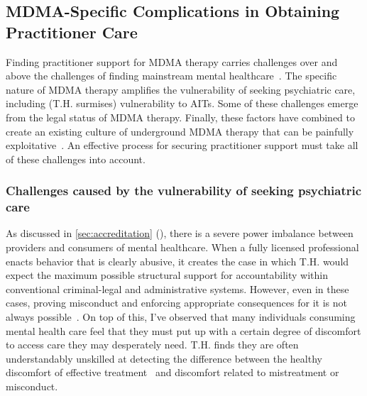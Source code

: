 \documentclass[11pt,oneside]{book}
\let\cite\parencite
\newcommand{\combinedcref}[1]{\cref{#1} (\nameref*{#1})} %
\begin{document}
\subsection*{MDMA-Specific Complications in Obtaining Practitioner Care}
\label{sec:mdmaTherapistComplications}
Finding practitioner support for MDMA therapy carries challenges over and above the challenges of finding mainstream mental healthcare~\cite{patientVulnerability}. The specific nature of MDMA therapy amplifies the vulnerability of seeking psychiatric care, including (T.H. surmises) vulnerability to AITs. Some of these challenges emerge from the legal status of MDMA therapy. Finally, these factors have combined to create an existing culture of underground MDMA therapy that can be painfully exploitative~\cite{hallMad}. An effective process for securing practitioner support must take all of these challenges into account.

\subsubsection*{Challenges caused by the vulnerability of seeking psychiatric care}
As discussed in \combinedcref{sec:accreditation}, there is a severe power imbalance between providers and consumers of mental healthcare. When a fully licensed professional enacts behavior that is clearly abusive, it creates the case in which T.H. would expect the maximum possible structural support for accountability within conventional criminal-legal and administrative systems. However, even in these cases, proving misconduct and enforcing appropriate consequences for it is not always possible~\cite{biaggio1998obstacles}. On top of this, I've observed that many individuals consuming mental health care feel that they must put up with a certain degree of discomfort to access care they may desperately need. T.H. finds they are often understandably unskilled at detecting the difference between the healthy discomfort of effective treatment~\cite{eckerUnlocking} and discomfort related to mistreatment or misconduct.
\end{document}
